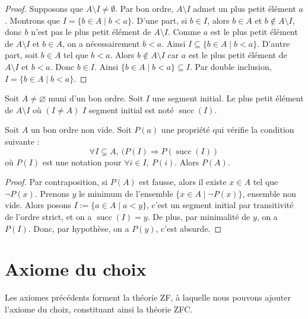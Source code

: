 \begin{proof}
 
Supposons que $A \setminus I \neq \emptyset$. Par bon ordre, $A \setminus I$ admet un plus petit élément $a$. Montrons que $I = \{b \in A \mid b < a\}$. 
D'une part, si $b \in I$, alors $b \in A$ et $b \notin A \setminus I$, donc $b$ n'est pas le plus petit élément de $A \setminus I$. Comme $a$ est le plus petit élément de $A \setminus I$ et $b \in A$, on a nécessairement $b < a$. Ainsi $I \subseteq \{b \in A \mid b < a\}$.
D'autre part, soit $b \in A$ tel que $b < a$. Alors $b \notin A \setminus I$ car $a$ est le plus petit élément de $A \setminus I$ et $b < a$. Donc $b \in I$. Ainsi $\{b \in A \mid b < a\} \subseteq I$.
Par double inclusion, $I = \{b \in A \mid b < a\}$.
\end{proof}

\begin{notation}
    Soit $A\ne\varnothing$ muni d'un bon ordre. Soit  $I$ une segment initial.  Le plus petit élément de $A\setminus I$ où $(I\neq A)$ $I$ segment initial est noté $\operatorname{succ}(I)$. 
\end{notation}

\begin{proposition}\label{ens : bo : induction}
    Soit $A$ un bon ordre non vide. Soit $P(a)$ une propriété qui vérifie la condition suivante :
\begin{equation*}
\forall I\subsetneq A,\ (P(I)\Rightarrow P(\operatorname{succ}(I))
\end{equation*}
où $P(I)$ est une notation pour $\forall i \in I,\ P(i)$. Alors $P(A)$.
\end{proposition}


\begin{proof}
    Par contraposition, si $P(A)$ est fausse, alors il existe $x\in A$ tel que $\neg P(x)$. Prenons $y$ le minimum de l'ensemble $\{x\in A\mid \neg P(x)\}$, ensemble non vide. Alors posons $I:=\{a\in A\mid a < y\}$, c'est un segment initial par transitivité de l'ordre strict, et on a $\operatorname{succ}(I) = y$. De plus, par minimalité de $y$, on a $P(I)$. Donc, par hypothèse, on a $P(y)$, c'est absurde.
\end{proof}

\section{Axiome du choix}
Les axiomes précédents forment la théorie ZF,
à laquelle nous pouvons ajouter l'axiome du choix, constituant ainsi la théorie ZFC.

